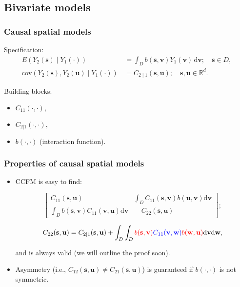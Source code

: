 \documentclass{beamer}
\newcommand{\svec} {\textbf{s}}
\newcommand{\uvec} {\textbf{u}}
\newcommand{\s}{\mathbf{s}}
\renewcommand{\v}{\mathbf{v}}
\renewcommand{\u}{\mathbf{u}}
\newcommand{\w}{\mathbf{w}}
\renewcommand{\d}{\mathrm{d}}
\newcommand{\E}{E}
\newcommand{\cov}{\mathrm{cov}}
\newcommand{\red}{\textcolor{red}}%
\newcommand{\blue}{\textcolor{blue}}
\begin{document}
\subsection{Bivariate models}

\begin{frame}
\frametitle{Causal spatial models}

Specification:
\begin{align}\label{eqn:E-and-cov}                                                          
\E\left(Y_2(\s)\mid Y_1(\cdot)\right)&\,=\int_D{b(\s,\v)Y_1(\v)\,\d \v};\quad \s\in D,\\
\cov\left(Y_2(\s),Y_2(\u)\mid Y_1(\cdot)\right)&\,=C_{2\mid 1}(\s,\u);\quad \s,\u\in \mathbb{R}^d.\end{align}  

Building blocks:
\begin{itemize}
\item $C_{11}(\cdot,\cdot)$,
\item $C_{2|1}(\cdot,\cdot)$,
\item $b(\cdot,\cdot)$ (interaction function).
\end{itemize}
\end{frame}


\begin{frame}
\frametitle{Properties of causal spatial models}

\begin{itemize}
\item  CCFM is easy to find:

\begin{equation}
\begin{bmatrix} C_{11}(\s,\u) & \int_DC_{11}(\s,\v)b(\u,\v)\d\v \\ \int_Db(\s,\v)C_{11}(\v,\u)\d\v & ~~~~~C_{22}(\s,\u)\end{bmatrix};                     
\end{equation}

\begin{equation}
\small
C_{22}(\s,\u) = C_{2\mid 1}(\s,\u)+\int_D\int_D \red{b(\s,\v)} \blue{C_{11}(\v,\w)} \red{b(\w,\u)}\d\v\d\w,
\end{equation}

and is always valid (we will outline the proof soon). \vfill

\item Asymmetry (i.e., $C_{12}(\svec,\uvec) \ne C_{21}(\svec,\uvec)$) is guaranteed if $b(\cdot,\cdot)$ is not symmetric. \vfill
\end{itemize}
\end{frame}
\end{document}

